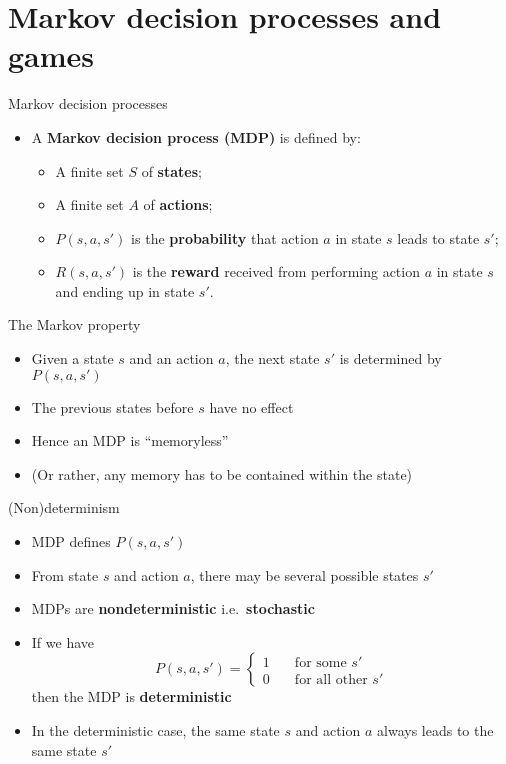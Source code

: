\part{Markov decision processes and games}
\frame{\partpage}

\begin{frame}{Markov decision processes}
	\begin{itemize}
		\pause\item A \textbf{Markov decision process (MDP)} is defined by:
			\begin{itemize}
				\pause\item A finite set $S$ of \textbf{states};
				\pause\item A finite set $A$ of \textbf{actions};
				\pause\item $P(s, a, s')$ is the \textbf{probability} that action $a$ in state $s$ leads to state $s'$;
				\pause\item $R(s, a, s')$ is the \textbf{reward} received from performing action $a$ in state $s$ and ending up in state $s'$.
			\end{itemize}
	\end{itemize}
\end{frame}

\begin{frame}{The Markov property}
	\begin{itemize}
		\pause\item Given a state $s$ and an action $a$, the next state $s'$ is determined by $P(s, a, s')$
		\pause\item The previous states before $s$ have no effect
		\pause\item Hence an MDP is ``memoryless''
		\pause\item (Or rather, any memory has to be contained within the state)
	\end{itemize}
\end{frame}

\begin{frame}{(Non)determinism}
	\begin{itemize}
		\pause\item MDP defines $P(s, a, s')$
		\pause\item From state $s$ and action $a$, there may be several possible states $s'$
		\pause\item MDPs are \textbf{nondeterministic} i.e.\ \textbf{stochastic}
		\pause\item If we have
			$$ P(s, a, s') = \begin{cases}
				1 &\quad\text{for some $s'$} \\
				0 &\quad\text{for all other $s'$}
			\end{cases} $$
			then the MDP is \textbf{deterministic}
		\pause\item In the deterministic case, the same state $s$ and action $a$ always leads to the same state $s'$
	\end{itemize}
\end{frame}

